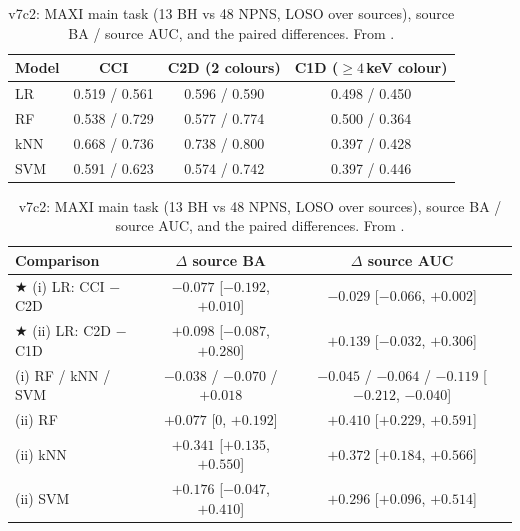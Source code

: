 \begin{table}[htbp]
\centering\small
\caption[MAXI strict pipeline]{\Primary{} v7c2: MAXI main task (13 BH vs 48 NPNS, LOSO over sources), source BA / source
AUC, and the paired differences. From .}
\label{tab:p4maxi}
\setlength{\tabcolsep}{4pt}
\begin{tabular}{@{}lccc@{}}
\toprule
Model & CCI & C2D (2 colours) & C1D ($\ge4$\,keV colour) \\
\midrule
LR & 0.519 / 0.561 & 0.596 / 0.590 & 0.498 / 0.450 \\
RF & 0.538 / 0.729 & 0.577 / 0.774 & 0.500 / 0.364 \\
kNN & 0.668 / 0.736 & 0.738 / 0.800 & 0.397 / 0.428 \\
SVM & 0.591 / 0.623 & 0.574 / 0.742 & 0.397 / 0.446 \\
\bottomrule
\end{tabular}

\vspace{0.6em}
\begin{tabular}{@{}lcc@{}}
\toprule
Comparison & $\Delta$ source BA & $\Delta$ source AUC \\
\midrule
$\bigstar$ (i) LR: CCI $-$ C2D & $-0.077$ [$-0.192$, $+0.010$] & $-0.029$ [$-0.066$, $+0.002$] \\
$\bigstar$ (ii) LR: C2D $-$ C1D & $+0.098$ [$-0.087$, $+0.280$] & $+0.139$ [$-0.032$, $+0.306$] \\
(i) RF / kNN / SVM & $-0.038$ / $-0.070$ / $+0.018$ & $-0.045$ / $-0.064$ / $-0.119$ [$-0.212$, $-0.040$] \\
(ii) RF & $+0.077$ [0, $+0.192$] & $+0.410$ [$+0.229$, $+0.591$] \\
(ii) kNN & $+0.341$ [$+0.135$, $+0.550$] & $+0.372$ [$+0.184$, $+0.566$] \\
(ii) SVM & $+0.176$ [$-0.047$, $+0.410$] & $+0.296$ [$+0.096$, $+0.514$] \\
\bottomrule
\end{tabular}
\end{table}

